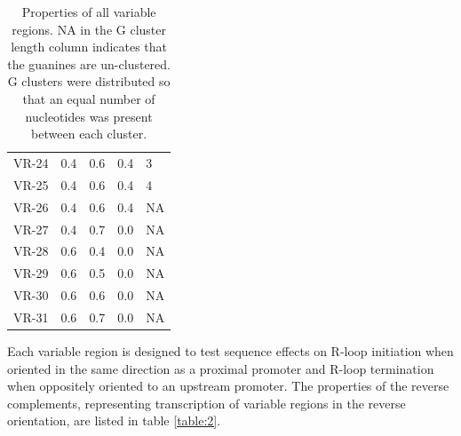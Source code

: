 \documentclass[11pt]{article}
\begin{document}
\begin{table}
\begin{tabular}{lrrrl}
	VR-24 &      0.4 &         0.6 &      0.4 &              3 \\
	VR-25 &      0.4 &         0.6 &      0.4 &              4 \\
	VR-26 &      0.4 &         0.6 &      0.4 &             NA \\
	VR-27 &      0.4 &         0.7 &      0.0 &             NA \\
	VR-28 &      0.6 &         0.4 &      0.0 &             NA \\
	VR-29 &      0.6 &         0.5 &      0.0 &             NA \\
	VR-30 &      0.6 &         0.6 &      0.0 &             NA \\
	VR-31 &      0.6 &         0.7 &      0.0 &             NA \\
	\bottomrule
\end{tabular}
\caption{Properties of all variable regions. NA in the G cluster length column indicates that the guanines are un-clustered. G clusters were distributed so that an equal number of nucleotides was present between each cluster.}
\label{table:1}
\end{table}

Each variable region is designed to test sequence effects on R-loop initiation when oriented in the same direction as a proximal promoter and R-loop termination when oppositely oriented to an upstream promoter. The properties of the reverse complements, representing transcription of variable regions in the reverse orientation, are listed in table \ref{table:2}. 
\end{document}
